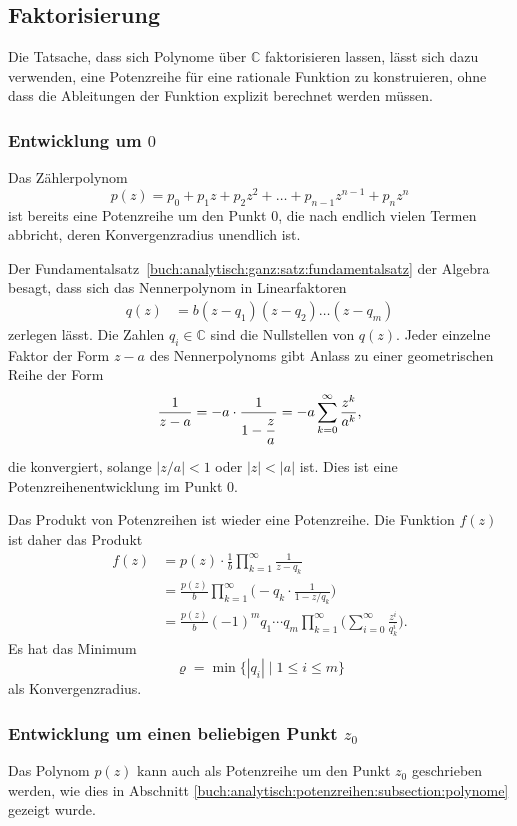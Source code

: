 %
%
%
\subsection{Faktorisierung
\label{buch:analytisch:rational:subsection:faktorisierung}}
Die Tatsache, dass sich Polynome über $\mathbb{C}$ faktorisieren
lassen, lässt sich dazu verwenden, eine Potenzreihe für eine
rationale Funktion zu konstruieren, ohne dass die Ableitungen
der Funktion explizit berechnet werden müssen.

%
%
\subsubsection{Entwicklung um $0$}
Das Zählerpolynom
\[
p(z)
=
p_0
+
p_1z
+
p_2z^2
+ \dots +
p_{n-1}z^{n-1}
+
p_nz^n
\]
ist bereits eine Potenzreihe um den Punkt $0$, die nach endlich
vielen Termen abbricht, deren Konvergenzradius unendlich ist.

Der Fundamentalsatz~\ref{buch:analytisch:ganz:satz:fundamentalsatz}
der Algebra besagt, dass sich das
Nennerpolynom in Linearfaktoren 
\begin{align*}
q(z) &= b(z - q_1)(z - q_2)\dots(z - q_m)
\end{align*}
zerlegen lässt. 
Die Zahlen $q_i\in\mathbb{C}$ sind die Nullstellen von $q(z)$.
Jeder einzelne Faktor der Form $z-a$ des Nennerpolynoms gibt
Anlass zu einer geometrischen Reihe der Form
\[
\frac{1}{z-a}
=
-a\cdot \frac{1}{\displaystyle 1-\frac{z\mathstrut}{a\mathstrut}}
=
-a
\sum_{k=0}^\infty
\frac{z^k}{a^k},
\]
die konvergiert, solange $|z/a|<1$ oder $|z| < |a|$ ist.
Dies ist eine Potenzreihenentwicklung im Punkt $0$.

Das Produkt von Potenzreihen ist wieder eine Potenzreihe.
Die Funktion $f(z)$ ist daher das Produkt
\begin{align*}
f(z)
&=
p(z)
\cdot
\frac{1}{b}
\prod_{k=1}^\infty
\frac{1}{z-q_k}
\\
&=
\frac{p(z)}{b}
\prod_{k=1}^\infty
\Biggl(
-q_k
\cdot
\frac{1}{\displaystyle 1-z/q_k}
\Biggr)
\\
&=
\frac{p(z)}{b}
(-1)^m
q_1\cdots q_m
\prod_{k=1}^\infty
\Biggr(
\sum_{i=0}^\infty
\frac{z^i}{q_k^i}
\Biggr).
\end{align*}
Es hat das Minimum
\[
\varrho 
=
\min
\{|q_i|\mid 1\le i\le m\}
\]
als Konvergenzradius.

%
%
\subsubsection{Entwicklung um einen beliebigen Punkt $z_0$}
Das Polynom $p(z)$ kann auch als Potenzreihe um den Punkt $z_0$
geschrieben werden, wie dies in Abschnitt
\ref{buch:analytisch:potenzreihen:subsection:polynome}
gezeigt wurde.
